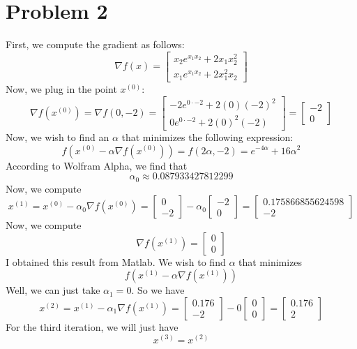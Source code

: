 \documentclass[12pt]{article}
\begin{document}
\section*{Problem 2}
First, we compute the gradient as follows:
\[
\nabla f(x) = \begin{bmatrix}
x_2e^{x_1x_2} + 2x_1 x_2^2\\
x_1e^{x_1x_2} + 2x_1^2 x_2
\end{bmatrix}
\] Now, we plug in the point $x^{(0)}$:
\[
\nabla f(x^{(0)}) = \nabla f(0,-2) =
 \begin{bmatrix}
-2e^{0\cdot-2} + 2(0)(-2)^2\\
0e^{0 \cdot - 2} + 2(0)^2 (-2)
\end{bmatrix} = \begin{bmatrix}
-2\\
0
\end{bmatrix}
\] Now, we wish to find an $\alpha$ that minimizes the following expression:
\[
f(x^{(0)}-\alpha \nabla f(x^{(0)})) = f(2\alpha, -2) = e^{-4\alpha} + 16\alpha^2
\] According to Wolfram Alpha, we find that
\[
\alpha_0 \approx 0.087933427812299
\] Now, we compute
\[
x^{(1)} = x^{(0)} - \alpha_0 \nabla f(x^{(0)}) = 
 \begin{bmatrix}
0\\
-2
\end{bmatrix} - \alpha_0 \begin{bmatrix}
-2\\
0
\end{bmatrix} =
\begin{bmatrix}
0.175866855624598\\
-2
\end{bmatrix}
\] Now, we compute
\[
\nabla f(x^{(1)}) =  \begin{bmatrix}
0\\
0
\end{bmatrix}
\] I obtained this result from Matlab. We wish to find $\alpha$ that minimizes
\[
f(x^{(1)} - \alpha \nabla f(x^{(1)}))
\] Well, we can just take $\alpha_1 = 0$. So we have
\[
x^{(2)} = x^{(1)} - \alpha_1   \nabla f(x^{(1)}) = \begin{bmatrix}
0.176\\
-2
\end{bmatrix} - 0 \begin{bmatrix}
0\\
0
\end{bmatrix} = 
 \begin{bmatrix}
0.176\\
2
\end{bmatrix} 
\] For the third iteration, we will just have
\[
x^{(3)} = x^{(2)}
\]
\end{document}

